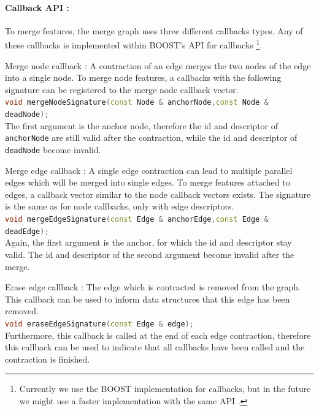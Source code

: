 \paragraph{Callback API :}

To merge features, the merge graph uses three different callbacks types.
Any of these callbacks is implemented within BOOST's API for callbacks \citep{ boost_function}
\footnote{
Currently we use the BOOST implementation for callbacks, but 
in the future we might use a faster implementation with the same API  \citep{code_project_function}.
}.


\begin{compactitem}
\item Merge node callback :
    A contraction of an edge merges the two nodes of the edge
    into a single node.
    To merge node features, a callbacks with the following signature 
    can be registered to the merge node callback vector.
    \\
    \lstinline[language=c++]{void mergeNodeSignature(const Node & anchorNode,const Node & deadNode);}
    \\
    The first argument is the anchor node, therefore the id and descriptor of
    \lstinline{anchorNode} are still  valid after the contraction, while
    the  id and descriptor of \lstinline{deadNode} become invalid.


\item Merge edge callback :
    A single edge contraction can lead to multiple parallel edges
    which will be merged into single edges.
    To merge features attached to edges, a callback vector
    similar to the node callback vectors exists.
    The signature is the same as for node callbacks, only with 
    edge descriptors.
    \\
    \lstinline[language=c++]{void mergeEdgeSignature(const Edge & anchorEdge,const Edge & deadEdge);}
    \\
    Again, the first argument is the anchor, for which the id and descriptor stay valid.
    The id and descriptor of the second argument become invalid after the merge.

\item Erase edge callback :
    The edge which is contracted is removed from the graph.
    This callback can be used to inform data structures 
    that this edge has been removed.
    \\
    \lstinline[language=c++]{void eraseEdgeSignature(const Edge & edge);}
    \\
    Furthermore, this callback is called at the end of each
    edge contraction, therefore this callback can be used
    to indicate that all callbacks have been called and
    the contraction is finished.

\end{compactitem}





